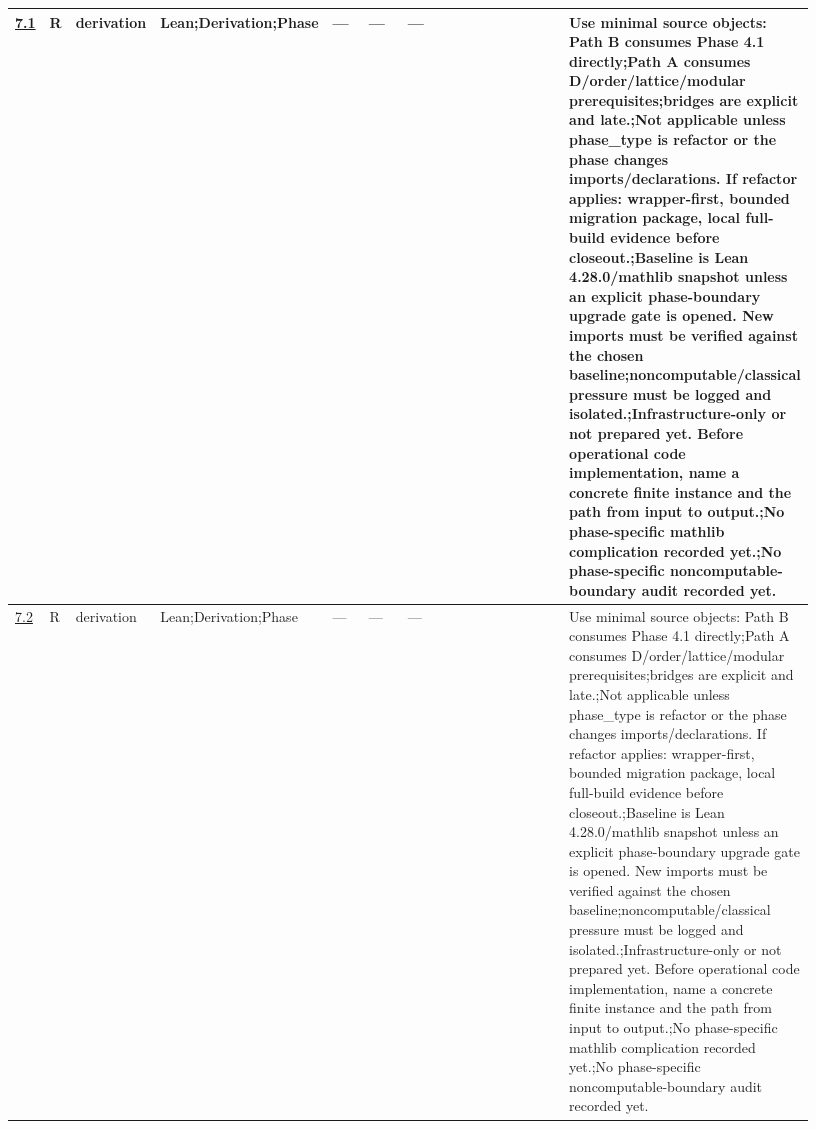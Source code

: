 \begin{longtable}{L{0.026\linewidth} L{0.024\linewidth} L{0.045\linewidth} L{0.07\linewidth} L{0.065\linewidth} L{0.075\linewidth} L{0.11\linewidth} L{0.19\linewidth} L{0.155\linewidth} L{0.17\linewidth}}
\hline
\addlinespace[0.24em]
\hyperlink{phase-row-7-1}{7.1} & R & derivation & Lean;\newline Derivation;\newline Phase & --- & --- & --- &  &  & Use minimal source objects: Path B consumes Phase 4.1 directly;\newline Path A consumes D/\allowbreak{}order/\allowbreak{}lattice/\allowbreak{}modular prerequisites;\newline bridges are explicit and late.;\newline Not applicable unless phase\_type is refactor or the phase changes imports/\allowbreak{}declarations. If refactor applies: wrapper-first, bounded migration package, local full-build evidence before closeout.;\newline Baseline is Lean 4.28.0/\allowbreak{}mathlib snapshot unless an explicit phase-boundary upgrade gate is opened. New imports must be verified against the chosen baseline;\newline noncomputable/\allowbreak{}classical pressure must be logged and isolated.;\newline Infrastructure-only or not prepared yet. Before operational code implementation, name a concrete finite instance and the path from input to output.;\newline No phase-specific mathlib complication recorded yet.;\newline No phase-specific noncomputable-boundary audit recorded yet.\\
\hline
\addlinespace[0.24em]
\hyperlink{phase-row-7-2}{7.2} & R & derivation & Lean;\newline Derivation;\newline Phase & --- & --- & --- &  &  & Use minimal source objects: Path B consumes Phase 4.1 directly;\newline Path A consumes D/\allowbreak{}order/\allowbreak{}lattice/\allowbreak{}modular prerequisites;\newline bridges are explicit and late.;\newline Not applicable unless phase\_type is refactor or the phase changes imports/\allowbreak{}declarations. If refactor applies: wrapper-first, bounded migration package, local full-build evidence before closeout.;\newline Baseline is Lean 4.28.0/\allowbreak{}mathlib snapshot unless an explicit phase-boundary upgrade gate is opened. New imports must be verified against the chosen baseline;\newline noncomputable/\allowbreak{}classical pressure must be logged and isolated.;\newline Infrastructure-only or not prepared yet. Before operational code implementation, name a concrete finite instance and the path from input to output.;\newline No phase-specific mathlib complication recorded yet.;\newline No phase-specific noncomputable-boundary audit recorded yet.\\

\end{longtable}
